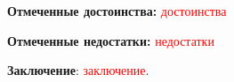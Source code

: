 \documentclass[fontsize=12pt]{diploma}
\begin{document}
\fillReviewHeader

\textbf{Отмеченные достоинства:} \textcolor{red}{достоинства}

\textbf{Отмеченные недостатки:} \textcolor{red}{недостатки}

\textbf{Заключение}: \textcolor{red}{заключение}.

\makeReviewSignature
\end{document}
